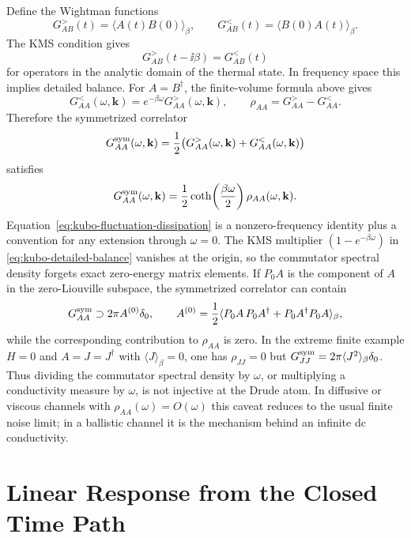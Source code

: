 Define the Wightman functions
\[
  G^>_{AB}(t)=\langle A(t)B(0)\rangle_\beta,\qquad
  G^<_{AB}(t)=\langle B(0)A(t)\rangle_\beta .
\]
The KMS condition gives
\[
  G^>_{AB}(t-\ii\beta)=G^<_{AB}(t)
\]
for operators in the analytic domain of the thermal state.  In frequency
space this implies detailed balance.  For \(A=B^\dagger\), the finite-volume
formula above gives
\begin{equation}
  G^<_{AA}(\omega,\mathbf k)
  =
  e^{-\beta\omega}G^>_{AA}(\omega,\mathbf k),
  \qquad
  \rho_{AA}=G^>_{AA}-G^<_{AA}.
  \label{eq:kubo-detailed-balance}
\end{equation}
Therefore the symmetrized correlator
\[
  G^{\rm sym}_{AA}(\omega,\mathbf k)
  =
  \frac12\bigl(G^>_{AA}(\omega,\mathbf k)
  +G^<_{AA}(\omega,\mathbf k)\bigr)
\]
satisfies
\begin{equation}
  G^{\rm sym}_{AA}(\omega,\mathbf k)
  =
  \frac12\coth\!\left(\frac{\beta\omega}{2}\right)
  \rho_{AA}(\omega,\mathbf k).
  \label{eq:kubo-fluctuation-dissipation}
\end{equation}
Equation~\eqref{eq:kubo-fluctuation-dissipation} is a nonzero-frequency
identity plus a convention for any extension through \(\omega=0\).  The KMS
multiplier
\((1-e^{-\beta\omega})\) in
\eqref{eq:kubo-detailed-balance} vanishes at the origin, so the commutator
spectral density forgets exact zero-energy matrix elements.  If
\(P_0A\) is the component of \(A\) in the zero-Liouville subspace, the
symmetrized correlator can contain
\[
  G^{\rm sym}_{AA}\supset 2\pi A^{(0)}\delta_0,
  \qquad
  A^{(0)}
  =
  \frac12\langle P_0A\,P_0A^\dagger+P_0A^\dagger P_0A\rangle_\beta ,
\]
while the corresponding contribution to \(\rho_{AA}\) is zero.  In the
extreme finite example \(H=0\) and \(A=J=J^\dagger\) with
\(\langle J\rangle_\beta=0\), one has
\(\rho_{JJ}=0\) but
\(G^{\rm sym}_{JJ}=2\pi\langle J^2\rangle_\beta\delta_0\).  Thus dividing the
commutator spectral density by \(\omega\), or multiplying a conductivity
measure by \(\omega\), is not injective at the Drude atom.  In diffusive or
viscous channels with \(\rho_{AA}(\omega)=O(\omega)\) this caveat reduces to
the usual finite noise limit; in a ballistic channel it is the mechanism
behind an infinite dc conductivity.

\section{Linear Response from the Closed Time Path}

